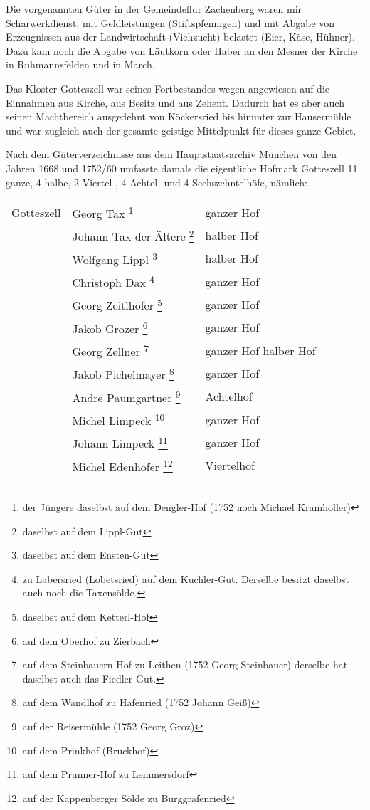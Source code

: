 \documentclass[12pt,a4pager]{book}
\begin{document}
Die vorgenannten Güter in der Gemeindeflur Zachenberg waren mir Scharwerkdienst,
mit Geldleistungen (Stiftspfennigen) und mit Abgabe von Erzeugnissen aus der
Landwirtschaft (Viehzucht) belastet (Eier, Käse, Hühner). Dazu kam noch die
Abgabe von Läutkorn oder Haber an den Mesner der Kirche in Ruhmannsfelden und in
March.

Das Kloster Gotteszell war seines Fortbestandes wegen angewiesen auf die
Einnahmen aus Kirche, aus Besitz und aus Zehent. Dadurch hat es aber auch seinen
Machtbereich ausgedehnt von Köckersried bis hinunter zur Hausermühle und war
zugleich auch der gesamte geistige Mittelpunkt für dieses ganze Gebiet.

Nach dem Güterverzeichnisse aus dem Hauptstaatsarchiv München von den Jahren
1668 und 1752/60 umfasste damals die eigentliche Hofmark Gotteszell 11 ganze, 4
halbe, 2 Viertel-, 4 Achtel- und 4 Sechszehntelhöfe, nämlich:

\begin{longtable}{l|l|l}
Gotteszell & Georg Tax \footnote{der Jüngere daselbst auf dem Dengler-Hof (1752
noch Michael Kramhöller)} & ganzer Hof\\

& Johann Tax der Ältere \footnote{daselbst auf dem Lippl-Gut} & halber Hof\\

& Wolfgang Lippl \footnote{daselbst auf dem Ensten-Gut} & halber Hof\\

& Christoph Dax \footnote{zu Labersried (Lobetsried) auf dem Kuchler-Gut.
Derselbe besitzt daselbst auch noch die Taxensölde.} & ganzer Hof\\

& Georg Zeitlhöfer \footnote{daselbst auf dem Ketterl-Hof} & ganzer Hof\\

& Jakob Grozer \footnote{auf dem Oberhof zu Zierbach} & ganzer Hof\\

& Georg Zellner \footnote{auf dem Steinbauern-Hof zu Leithen (1752 Georg
Steinbauer) derselbe hat daselbst auch das Fiedler-Gut.} & ganzer Hof halber
Hof\\

& Jakob Pichelmayer \footnote{auf dem Wandlhof zu Hafenried (1752 Johann Geiß)}
& ganzer Hof\\

& Andre Paumgartner \footnote{auf der Reisermühle (1752 Georg Groz)} &
Achtelhof\\

& Michel Limpeck \footnote{auf dem Prinkhof (Bruckhof)} & ganzer Hof\\

& Johann Limpeck \footnote{auf dem Prunner-Hof zu Lemmersdorf} & ganzer Hof\\

& Michel Edenhofer \footnote{auf der Kappenberger Sölde zu Burggrafenried} &
Viertelhof\\
\end{longtable}
\end{document}
